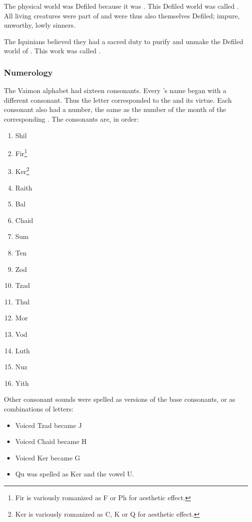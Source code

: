 The physical world was Defiled because it was . 
This Defiled world was called \Gehinnom. 
All living creatures were part of \Gehinnom and were thus also themselves Defiled; impure, unworthy, lowly sinners. 

The Iquinians believed they had a sacred duty to purify and unmake the Defiled world of \Gehinnom. 
This work was called .





\subsubsection{Numerology}
The Vaimon alphabet had sixteen consonants.
Every \sephirah's name began with a different consonant. 
Thus the letter corresponded to the \sephirah and its virtue. 
Each consonant also had a number, the same as the number of the month of the corresponding \sephirah.
The consonants are, in order: 
\begin{enumerate}
  \item Shil
  \item Fir\footnote{Fir is variously romanized as F or Ph for aesthetic effect.}
  \item Ker\footnote{Ker is variously romanized as C, K or Q for aesthetic effect.}
  \item Raith
  
  \item Bal
  \item Chaid
  \item Sum
  \item Ten
  
  \item Zod
  \item Tzad
  \item Thul
  \item Mor
  
  \item Vod
  \item Luth
  \item Nuz
  \item Yith
\end{enumerate}


Other consonant sounds were spelled as  versions of the base consonants, or as combinations of letters:
\begin{itemize}
  \item Voiced Tzad became J
  \item Voiced Chaid became H
  \item Voiced Ker became G
  \item Qu was spelled as Ker and the vowel U.
\end{itemize}


